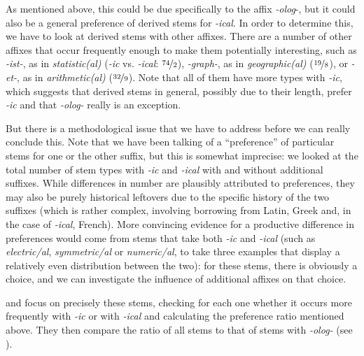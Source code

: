 As mentioned above, this could be due specifically to the affix  \textit{-olog}-, but it could also be a general preference of derived stems  for \textit{-ical}. In order to determine this, we have to look at derived stems with other affixes.  There are a number of other affixes  that occur frequently enough to make them potentially interesting, such as \textit{-ist-}, as in \textit{statistic(al)} (\textit{-ic} vs. \textit{-ical}:  $\nicefrac{74}{2}$), \textit{-graph-}, as in \textit{geographic(al)} ($\nicefrac{19}{8}$), or \textit{-et-}, as in \textit{arithmetic(al)} ($\nicefrac{32}{9}$). Note that all of them have more types  with \textit{-ic}, which suggests that derived stems  in general, possibly due to their length,  prefer \textit{-ic} and that \textit{-olog-} really is an exception.

But there is a methodological issue that we have to address before we can really conclude this. Note that we have been talking of a ``preference'' of particular stems for one or the other suffix,  but this is somewhat imprecise: we looked at the total number of stem types  with \textit{-ic} and \textit{-ical} with and without additional suffixes.  While differences in number are plausibly attributed to preferences, they may also be purely historical leftovers due to the specific history of the two suffixes  (which is rather complex, involving borrowing from Latin, Greek and, in the case of \textit{-ical}, French). More convincing evidence for a productive  difference in preferences would come from stems  that take both \textit{-ic} and \textit{-ical} (such as \textit{electric/al}, \textit{symmetric/al} or \textit{numeric/al}, to take three examples that display a relatively even distribution  between the two): for these stems, there is obviously a choice, and we can investigate the influence of additional affixes  on that  choice.

\citet{lindsay_rival_2011} and \citet{lindsay_natural_2013} focus on precisely these stems, checking for each one whether it occurs more frequently with \textit{-ic} or with \textit{-ical} and calculating the preference ratio mentioned above.  They then compare the ratio of all stems  to that of stems with \textit{-olog-} (see ).

